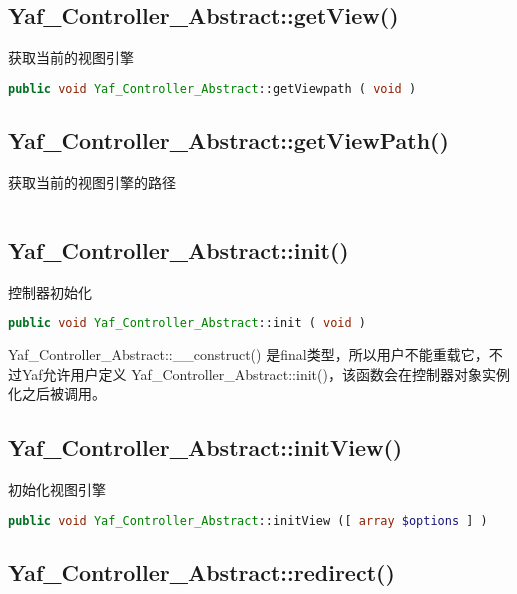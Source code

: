 \subsection{Yaf\_Controller\_Abstract::getView()}

获取当前的视图引擎

\begin{lstlisting}[language=PHP]
public void Yaf_Controller_Abstract::getViewpath ( void )
\end{lstlisting}

\subsection{Yaf\_Controller\_Abstract::getViewPath()}

获取当前的视图引擎的路径

\begin{lstlisting}[language=PHP]

\end{lstlisting}

\subsection{Yaf\_Controller\_Abstract::init()}

控制器初始化


\begin{lstlisting}[language=PHP]
public void Yaf_Controller_Abstract::init ( void )
\end{lstlisting}


Yaf\_Controller\_Abstract::\_\_construct() 是final类型，所以用户不能重载它，不过Yaf允许用户定义 Yaf\_Controller\_Abstract::init()，该函数会在控制器对象实例化之后被调用。





\subsection{Yaf\_Controller\_Abstract::initView()}

初始化视图引擎


\begin{lstlisting}[language=PHP]
public void Yaf_Controller_Abstract::initView ([ array $options ] )
\end{lstlisting}

\subsection{Yaf\_Controller\_Abstract::redirect()}

